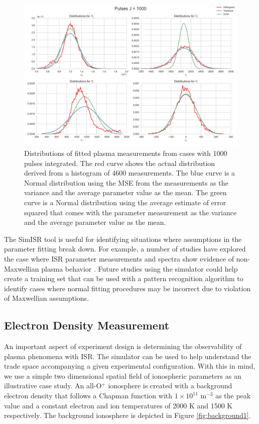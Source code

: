 \documentclass[draft,ras]{agutex}
\begin{document}
\begin{article}
\begin{figure}[!t]
\centering
\includegraphics[width=5in]{histsingle}
\caption{Distributions of fitted plasma measurements from cases with 1000 pulses integrated. The red curve shows the actual distribution derived from a histogram of 4600 measurements. The blue curve is a Normal distribution using the MSE from the measurements as the variance and the average parameter value as the mean.  The green curve is a Normal distribution using the average estimate of error squared that comes with the parameter measurement as the variance and the average parameter value as the mean.}
\label{fig:statshistsingle}
\end{figure}


The SimISR tool is useful for identifying situations where assumptions in the parameter fitting break down. For example, a number of studies have explored the case where ISR parameter measurements and spectra show evidence of non-Maxwellian plasma behavior \citep[see, e.g.,][for AMISR examples]{Akbari:2012dz,Akbari:2015fv}. Future studies using the simulator could help create a training set that can be used with a pattern recognition algorithm to identify cases where normal fitting procedures may be incorrect due to violation of Maxwellian assumptions.

\subsection{Electron Density Measurement}
An important aspect of experiment design is determining the observability of plasma phenomena with ISR. The simulator can be used to help understand the trade space accompanying a given experimental configuration. With this in mind, we use a simple two dimensional spatial field of ionospheric parameters as an illustrative case study. An all-O$^+$ ionosphere is created with a background electron density that follows a Chapman function with $1\times10^{11}$ m$^{-3}$ as the peak value and a constant electron and ion temperatures of 2000 K and 1500 K respectively. The background ionosphere is depicted in Figure \ref{fig:background1}.


\end{article}
\end{document}
